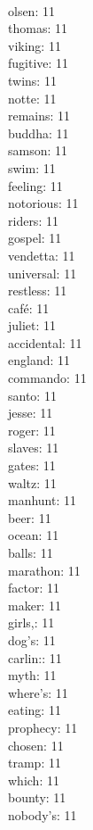 \begin{multicols}{6}
  \\ olsen: 11
  \\ thomas: 11
  \\ viking: 11
  \\ fugitive: 11
  \\ twins: 11
  \\ notte: 11
  \\ remains: 11
  \\ buddha: 11
  \\ samson: 11
  \\ swim: 11
  \\ feeling: 11
  \\ notorious: 11
  \\ riders: 11
  \\ gospel: 11
  \\ vendetta: 11
  \\ universal: 11
  \\ restless: 11
  \\ café: 11
  \\ juliet: 11
  \\ accidental: 11
  \\ england: 11
  \\ commando: 11
  \\ santo: 11
  \\ jesse: 11
  \\ roger: 11
  \\ slaves: 11
  \\ gates: 11
  \\ waltz: 11
  \\ manhunt: 11
  \\ beer: 11
  \\ ocean: 11
  \\ balls: 11
  \\ marathon: 11
  \\ factor: 11
  \\ maker: 11
  \\ girls,: 11
  \\ dog's: 11
  \\ carlin:: 11
  \\ myth: 11
  \\ where's: 11
  \\ eating: 11
  \\ prophecy: 11
  \\ chosen: 11
  \\ tramp: 11
  \\ which: 11
  \\ bounty: 11
  \\ nobody's: 11

\end{multicols}
